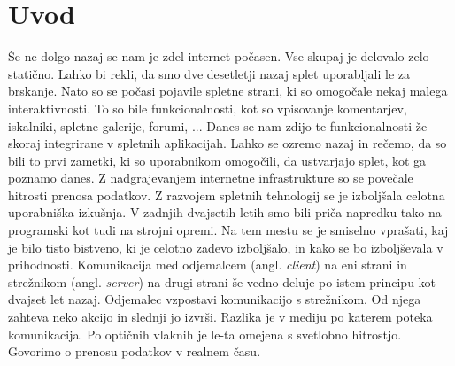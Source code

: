 \documentclass[a4paper, 12pt, twoside]{book}
\newcommand{\clearemptydoublepage}{\newpage{\pagestyle{empty}\cleardoublepage}} %
\begin{document}
\clearemptydoublepage

\mainmatter
\setcounter{page}{1}

\chapter{Uvod}

Še ne dolgo nazaj se nam je zdel internet počasen. Vse skupaj je delovalo zelo statično. Lahko bi rekli, da smo dve desetletji nazaj splet uporabljali le za brskanje. Nato so se počasi pojavile spletne strani, ki so omogočale nekaj malega interaktivnosti. To so bile funkcionalnosti, kot so vpisovanje komentarjev, iskalniki, spletne galerije, \linebreak forumi, ... Danes se nam zdijo te funkcionalnosti že skoraj integrirane v spletnih aplikacijah. Lahko se ozremo nazaj in rečemo, da so bili to prvi zametki, ki so uporabnikom omogočili, da ustvarjajo splet, kot ga poznamo danes. Z nadgrajevanjem internetne infrastrukture so se povečale hitrosti prenosa podatkov. Z razvojem spletnih tehnologij se je izboljšala celotna uporabniška izkušnja. V zadnjih dvajsetih letih smo bili priča napredku tako na programski kot tudi na strojni opremi. Na tem mestu se je smiselno vprašati, kaj je bilo tisto bistveno, ki je celotno zadevo izboljšalo, in kako se bo izboljševala v prihodnosti. Komunikacija med odjemalcem (angl. \textit{client}) na eni strani in strežnikom (angl. \textit{server}) na drugi strani še vedno deluje po istem principu kot dvajset let nazaj. Odjemalec vzpostavi komunikacijo s strežnikom. Od njega zahteva neko akcijo in slednji jo izvrši. Razlika je v mediju po katerem poteka komunikacija. Po optičnih vlaknih je le-ta omejena s svetlobno hitrostjo. Govorimo o prenosu podatkov v realnem času.
\end{document}
